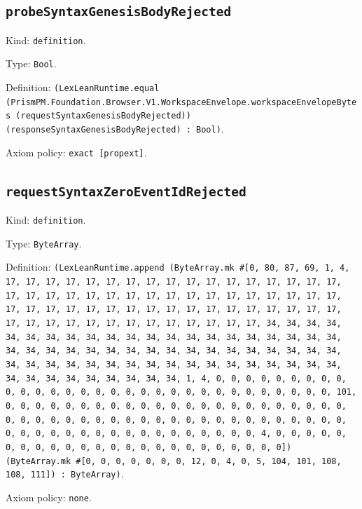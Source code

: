 \documentclass[11pt]{article}
\begin{document}
\subsection*{\texttt{probeSyntaxGenesisBodyRejected}}
\noindent Kind: \texttt{definition}.\par
\noindent Type: \texttt{Bool}.\par
\noindent Definition: \texttt{(LexLeanRuntime.equal (PrismPM.Foundation.Browser.V1.WorkspaceEnvelope.workspaceEnvelopeBytes (requestSyntaxGenesisBodyRejected)) (responseSyntaxGenesisBodyRejected) : Bool)}.\par
\noindent Axiom policy: \texttt{exact [propext]}.\par
\subsection*{\texttt{requestSyntaxZeroEventIdRejected}}
\noindent Kind: \texttt{definition}.\par
\noindent Type: \texttt{ByteArray}.\par
\noindent Definition: \texttt{(LexLeanRuntime.append (ByteArray.mk \#[0, 80, 87, 69, 1, 4, 17, 17, 17, 17, 17, 17, 17, 17, 17, 17, 17, 17, 17, 17, 17, 17, 17, 17, 17, 17, 17, 17, 17, 17, 17, 17, 17, 17, 17, 17, 17, 17, 17, 17, 17, 17, 17, 17, 17, 17, 17, 17, 17, 17, 17, 17, 17, 17, 17, 17, 17, 17, 17, 17, 17, 17, 17, 17, 17, 17, 17, 17, 17, 17, 34, 34, 34, 34, 34, 34, 34, 34, 34, 34, 34, 34, 34, 34, 34, 34, 34, 34, 34, 34, 34, 34, 34, 34, 34, 34, 34, 34, 34, 34, 34, 34, 34, 34, 34, 34, 34, 34, 34, 34, 34, 34, 34, 34, 34, 34, 34, 34, 34, 34, 34, 34, 34, 34, 34, 34, 34, 34, 34, 34, 34, 34, 34, 34, 1, 4, 0, 0, 0, 0, 0, 0, 0, 0, 0, 0, 0, 0, 0, 0, 0, 0, 0, 0, 0, 0, 0, 0, 0, 0, 0, 0, 0, 0, 0, 0, 0, 101, 0, 0, 0, 0, 0, 0, 0, 0, 0, 0, 0, 0, 0, 0, 0, 0, 0, 0, 0, 0, 0, 0, 0, 0, 0, 0, 0, 0, 0, 0, 0, 0, 0, 0, 0, 0, 0, 0, 0, 0, 0, 0, 0, 0, 0, 0, 0, 0, 0, 0, 0, 0, 0, 0, 0, 0, 0, 0, 0, 0, 0, 0, 0, 4, 0, 0, 0, 0, 0, 0, 0, 0, 0, 0, 0, 0, 0, 0, 0, 0, 0, 0, 0, 0, 0, 0, 0, 0]) (ByteArray.mk \#[0, 0, 0, 0, 0, 0, 0, 12, 0, 4, 0, 5, 104, 101, 108, 108, 111]) : ByteArray)}.\par
\noindent Axiom policy: \texttt{none}.\par
\end{document}
